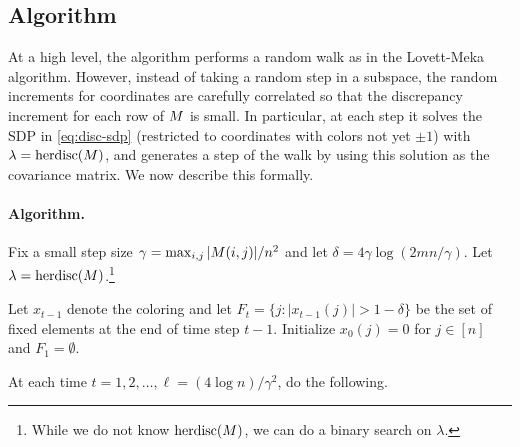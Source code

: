 \subsection{Algorithm}
At a high level, the algorithm performs a random walk as in the Lovett-Meka algorithm. However, instead of taking a random step in a subspace, the random increments for coordinates are carefully correlated so that the discrepancy increment for each row of $M$ is small. In particular, at each step it solves the SDP in \eqref{eq:disc-sdp}  (restricted to coordinates with colors not yet $\pm 1$) with $\lambda = \operatorname{herdisc}(M)$, and generates a step of the walk by using this solution as the covariance matrix.  
We now describe this formally.






\paragraph{ Algorithm.} Fix a small step size $\gamma = \max_{i,j}|M(i,j)|/n^2$  and let $\delta = 4 \gamma \log(2mn/\gamma)$. 
Let $\lambda = \operatorname{herdisc}(M)$.\footnote{While we do not know $\operatorname{herdisc}(M)$, we can do a binary search on $\lambda$.}  

Let $x_{t-1}$ denote the coloring and let $F_t = \{j: |x_{t-1}(j)| > 1-\delta\}$ be the set of fixed elements at the end of time step $t-1$. 
Initialize $x_0(j) =0$ for $j\in [n]$ and $F_1= \emptyset$. 

\medskip 

 \noindent At each time $t=1,2,\ldots,\ell = (4 \log n)/\gamma^2$, do the following. 
 
\smallskip 

